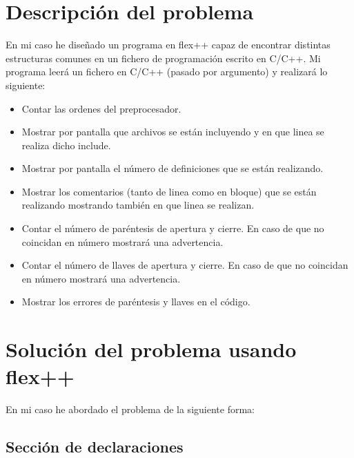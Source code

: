 \documentclass[12pt, spanish]{article}
\begin{document}



\section{Descripción del problema}

En mi caso he diseñado un programa en flex++ capaz de encontrar distintas estructuras comunes en un fichero de programación escrito en C/C++. Mi programa leerá un fichero en C/C++ (pasado por argumento) y realizará lo siguiente:

\begin{itemize}
  \item Contar las ordenes del preprocesador.
  \item Mostrar por pantalla que archivos se están incluyendo y en que linea se realiza dicho include.
  \item Mostrar por pantalla el número de definiciones que se están realizando.
  \item Mostrar los comentarios (tanto de linea como en bloque) que se están realizando mostrando también en que linea se realizan.
  \item Contar el número de paréntesis de apertura y cierre. En caso de que no coincidan en número mostrará una advertencia.
  \item Contar el número de llaves de apertura y cierre. En caso de que no coincidan en número mostrará una advertencia.
  \item Mostrar los errores de paréntesis y llaves en el código.
\end{itemize}



\newpage

\section{Solución del problema usando flex++}

En mi caso he abordado el problema de la siguiente forma:




\subsection{Sección de declaraciones}
\end{document}
